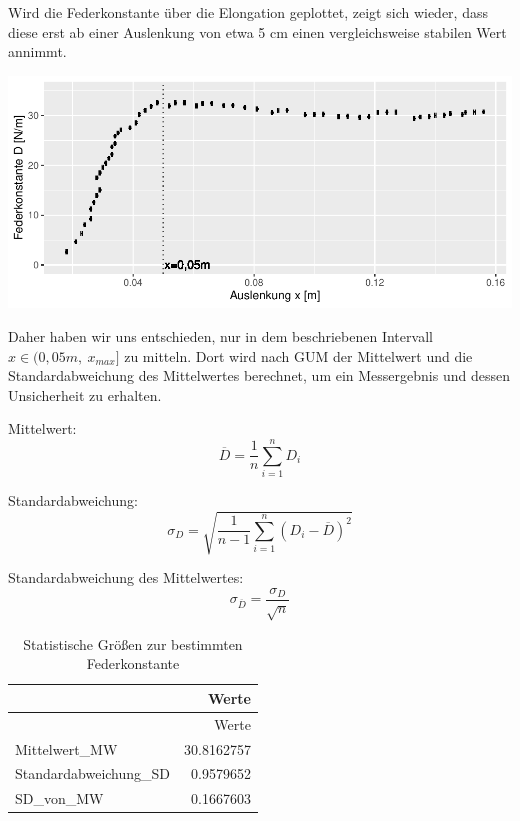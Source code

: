 \documentclass[class=article, crop=false]{standalone}
\begin{document}
Wird die Federkonstante über die Elongation geplottet, zeigt sich
wieder, dass diese erst ab einer Auslenkung von etwa 5 cm einen
vergleichsweise stabilen Wert annimmt.

\begin{center}\includegraphics{DehnbareStoffe_files/figure-latex/unnamed-chunk-9-1} \end{center}

Daher haben wir uns entschieden, nur in dem beschriebenen Intervall
\(x \in (0,05m,\ x_{max}]\) zu mitteln. Dort wird nach GUM der
Mittelwert und die Standardabweichung des Mittelwertes berechnet, um ein
Messergebnis und dessen Unsicherheit zu erhalten.

Mittelwert: \begin{equation}\label{Mittelwert}
\overline{D} = \frac{1}{n}\sum \limits_{i=1}^nD_i
\end{equation}

Standardabweichung: \begin{equation}\label{Standardabweichung}
\sigma_D = \sqrt{\frac{1}{n-1} \sum_{i=1}^n (D_i - \overline{D})^2}
\end{equation}

Standardabweichung des Mittelwertes:
\begin{equation}\label{StandardabweichungDesMittelwertes}
\sigma_{\overline{D}}=\frac{\sigma_D}{\sqrt{n}}
\end{equation}

\begin{longtable}[]{@{}lr@{}}
\caption{Statistische Größen zur bestimmten
Federkonstante}\tabularnewline
\toprule()
& Werte \\
\midrule()
\endfirsthead
\toprule()
& Werte \\
\midrule()
\endhead
Mittelwert\_MW & 30.8162757 \\
Standardabweichung\_SD & 0.9579652 \\
SD\_von\_MW & 0.1667603 \\
\bottomrule()
\end{longtable}
\end{document}

